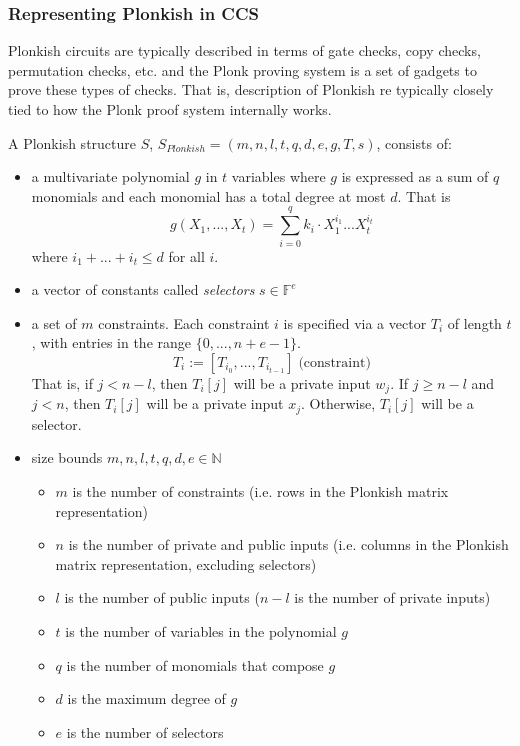 \documentclass[
    9pt,            %
    techreport,        %
    affiltop,       %
]{art}
\begin{document}
\subsubsection{Representing Plonkish in CCS}

Plonkish circuits are typically described in terms of gate checks, copy checks, permutation checks, etc. and the Plonk proving system is a set of gadgets to prove these types of checks. That is, description of Plonkish re typically closely tied to how the Plonk proof system internally works.

\begin{definition}[Plonkish]
    A Plonkish structure $S$, $S_{Plonkish}=(m,n,l,t,q,d,e,g,T,s)$, consists of:
    \begin{itemize}
        \item a multivariate polynomial $g$ in $t$ variables where $g$ is expressed as a sum of $q$ monomials and each monomial has a total degree at most $d$. That is
        \begin{equation*}
            g(X_1,...,X_t) = \sum_{i=0}^q k_i \cdot X_1^{i_1} ... X_t^{i_t}
        \end{equation*}
        where $i_1 + ... + i_t \leq d$ for all $i$.
        \item a vector of constants called \textit{selectors} $s \in \mathbb{F}^e$
        \item a set of $m$ constraints. Each constraint $i$ is specified via a vector $T_i$ of length $t$, with entries in the range $\{0,...,n+e-1\}$.
        \begin{equation*}
            T_i := [T_{i_0}, ..., T_{i_{t-1}}] \; \text{(constraint)}
        \end{equation*}
        That is, if $j < n-l$, then $T_i[j]$ will be a private input $w_j$. If $j \geq n-l$ and $j < n$, then $T_i[j]$ will be a private input $x_j$. Otherwise, $T_i[j]$ will be a selector.
        \item size bounds $m, n, l, t, q, d, e \in \mathbb{N}$
        \begin{itemize}
            \item $m$ is the number of constraints (i.e. rows in the Plonkish matrix representation)
            \item $n$ is the number of private and public inputs (i.e. columns in the Plonkish matrix representation, excluding selectors)
            \item $l$ is the number of public inputs ($n-l$ is the number of private inputs)
            \item $t$ is the number of variables in the polynomial $g$
            \item $q$ is the number of monomials that compose $g$
            \item $d$ is the maximum degree of $g$
            \item $e$ is the number of selectors
        \end{itemize}
    \end{itemize}
\end{definition}
\end{document}
